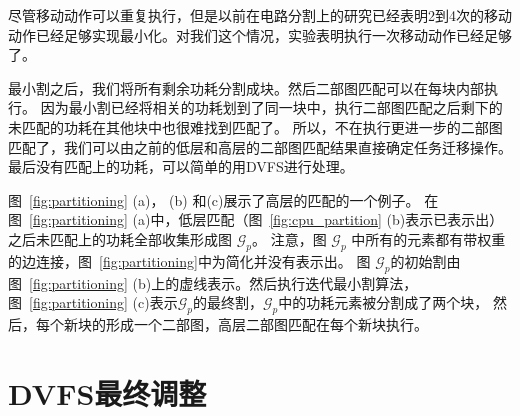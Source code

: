 尽管移动动作可以重复执行，但是以前在电路分割上的研究已经表明2到4次的移动动作已经足够实现最小化。对我们这个情况，实验表明执行一次移动动作已经足够了。

最小割之后，我们将所有剩余功耗分割成块。然后二部图匹配可以在每块内部执行。
因为最小割已经将相关的功耗划到了同一块中，执行二部图匹配之后剩下的未匹配的功耗在其他块中也很难找到匹配了。
所以，不在执行更进一步的二部图匹配了，我们可以由之前的低层和高层的二部图匹配结果直接确定任务迁移操作。
最后没有匹配上的功耗，可以简单的用DVFS进行处理。

图~\ref{fig:partitioning} (a)， (b) 和(c)展示了高层的匹配的一个例子。
在图~\ref{fig:partitioning} (a)中，低层匹配（图~\ref{fig:cpu_partition} (b)表示已表示出）之后未匹配上的功耗全部收集形成图 $\mathcal{G}_p$。
注意，图 $\mathcal{G}_p$ 中所有的元素都有带权重的边连接，图~\ref{fig:partitioning}中为简化并没有表示出。
图 $\mathcal{G}_p$的初始割由图~\ref{fig:partitioning} (b)上的虚线表示。然后执行迭代最小割算法，
图~\ref{fig:partitioning} (c)表示$\mathcal{G}_p$的最终割，$\mathcal{G}_p$中的功耗元素被分割成了两个块，
然后，每个新块的形成一个二部图，高层二部图匹配在每个新块执行。


\section{DVFS最终调整}\label{sec:dvfs_adj}



















































